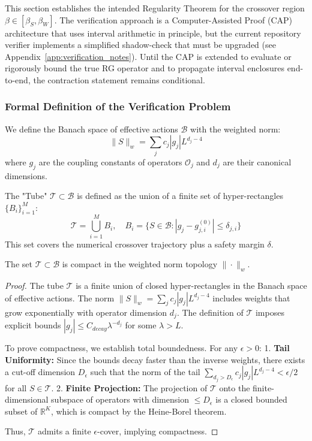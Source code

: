This section establishes the intended Regularity Theorem for the crossover region $\beta \in [\beta_S, \beta_W]$. The verification approach is a Computer-Assisted Proof (CAP) architecture that uses interval arithmetic in principle, but the current repository verifier implements a simplified shadow-check that must be upgraded (see Appendix~\ref{app:verification_notes}). Until the CAP is extended to evaluate or rigorously bound the true RG operator and to propagate interval enclosures end-to-end, the contraction statement remains conditional.

\subsubsection{Formal Definition of the Verification Problem}

We define the Banach space of effective actions $\mathcal{B}$ with the weighted norm:
\[ \| S \|_w = \sum_{j} c_j |g_j| L^{d_j - 4} \]
where $g_j$ are the coupling constants of operators $\mathcal{O}_j$ and $d_j$ are their canonical dimensions.

\begin{definition}
The "Tube" $\mathcal{T} \subset \mathcal{B}$ is defined as the union of a finite set of hyper-rectangles $\{B_i\}_{i=1}^M$:
\[ \mathcal{T} = \bigcup_{i=1}^M B_i, \quad B_i = \{ S \in \mathcal{B} : |g_j - g_{j,i}^{(0)}| \le \delta_{j,i} \} \]
This set covers the numerical crossover trajectory plus a safety margin $\delta$.
\end{definition}

\begin{lemma}
\label{lem:tube_compactness}
The set $\mathcal{T} \subset \mathcal{B}$ is compact in the weighted norm topology $\|\cdot\|_w$.
\begin{proof}
    The tube $\mathcal{T}$ is a finite union of closed hyper-rectangles in the Banach space of effective actions. The norm $\|S\|_w = \sum_j c_j |g_j| L^{d_j-4}$ includes weights that grow exponentially with operator dimension $d_j$. The definition of $\mathcal{T}$ imposes explicit bounds $|g_j| \le C_{decay} \lambda^{-d_j}$ for some $\lambda > L$.
    
    To prove compactness, we establish total boundedness. For any $\epsilon > 0$:
    1. \textbf{Tail Uniformity:} Since the bounds decay faster than the inverse weights, there exists a cut-off dimension $D_{\epsilon}$ such that the norm of the tail $\sum_{d_j > D_{\epsilon}} c_j |g_j| L^{d_j-4} < \epsilon/2$ for all $S \in \mathcal{T}$.
    2. \textbf{Finite Projection:} The projection of $\mathcal{T}$ onto the finite-dimensional subspace of operators with dimension $\le D_{\epsilon}$ is a closed bounded subset of $\mathbb{R}^K$, which is compact by the Heine-Borel theorem.
    
    Thus, $\mathcal{T}$ admits a finite $\epsilon$-cover, implying compactness.
\end{proof}
\end{lemma}

